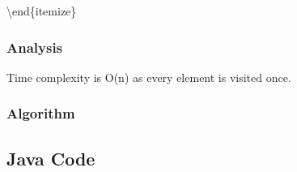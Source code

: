 \documentclass[]{book}
\begin{document}
\textbackslash{}end\{itemize\}

\hypertarget{analysis-39}{%
\subsubsection{Analysis}\label{analysis-39}}

Time complexity is O(n) as every element is visited once.

\hypertarget{algorithm-39}{%
\subsubsection{Algorithm}\label{algorithm-39}}

\hypertarget{java-code-33}{%
\subsection{Java Code}\label{java-code-33}}
\end{document}
